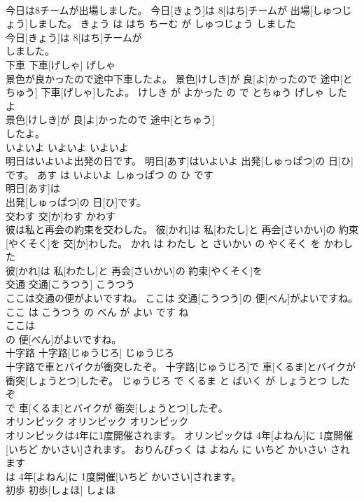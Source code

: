 \documentclass[8pt]{extreport}
\begin{document}
\begin{CJK}{UTF8}{min}
\\	今日は8チームが出場しました。	今日[きょう]は 8[はち]チームが 出場[しゅつじょう]しました。	きょう は はち ちーむ が しゅつじょう しました	
\\	今日[きょう]は 8[はち]チームが
\\	しました。			
\\	下車	下車[げしゃ]	げしゃ	
\\	景色が良かったので途中下車したよ。	景色[けしき]が 良[よ]かったので 途中[とちゅう] 下車[げしゃ]したよ。	けしき が よかった の で とちゅう げしゃ した よ	
\\	景色[けしき]が 良[よ]かったので 途中[とちゅう]
\\	したよ。			
\\	いよいよ	いよいよ	いよいよ	
\\	明日はいよいよ出発の日です。	明日[あす]はいよいよ 出発[しゅっぱつ]の 日[ひ]です。	あす は いよいよ しゅっぱつ の ひ です	
\\	明日[あす]は
\\	出発[しゅっぱつ]の 日[ひ]です。			
\\	交わす	交[か]わす	かわす	
\\	彼は私と再会の約束を交わした。	彼[かれ]は 私[わたし]と 再会[さいかい]の 約束[やくそく]を 交[か]わした。	かれ は わたし と さいかい の やくそく を かわした	
\\	彼[かれ]は 私[わたし]と 再会[さいかい]の 約束[やくそく]を
\\	交通	交通[こうつう]	こうつう	
\\	ここは交通の便がよいですね。	ここは 交通[こうつう]の 便[べん]がよいですね。	ここ は こうつう の べん が よい です ね	
\\	ここは
\\	の 便[べん]がよいですね。			
\\	十字路	十字路[じゅうじろ]	じゅうじろ	
\\	十字路で車とバイクが衝突したぞ。	十字路[じゅうじろ]で 車[くるま]とバイクが 衝突[しょうとつ]したぞ。	じゅうじろ で くるま と ばいく が しょうとつ した ぞ	
\\	で 車[くるま]とバイクが 衝突[しょうとつ]したぞ。			
\\	オリンピック	オリンピック	オリンピック	
\\	オリンピックは4年に1度開催されます。	オリンピックは 4年[よねん]に 1度開催[いちど かいさい]されます。	おりんぴっく は よねん に いちど かいさい されます	
\\	は 4年[よねん]に 1度開催[いちど かいさい]されます。			
\\	初歩	初歩[しょほ]	しょほ	

\end{CJK}
\end{document}
